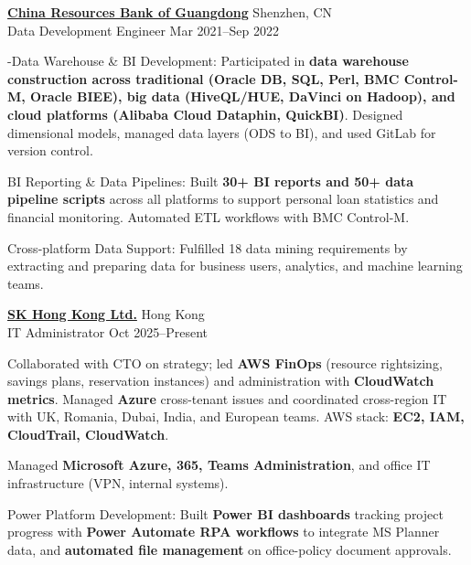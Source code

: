 \begin{entrylist}
    \item \textbf{\href{https://www.crbank.com.cn/}{China Resources Bank of Guangdong}} \hfill Shenzhen, CN\\
    Data Development Engineer \hfill Mar 2021--Sep 2022\\

    \begin{detaillist}
        \item -Data Warehouse \& BI Development: Participated in \textbf{data warehouse construction across traditional (Oracle DB, SQL, Perl, BMC Control-M, Oracle BIEE), big data (HiveQL/HUE, DaVinci on Hadoop), and cloud platforms (Alibaba Cloud Dataphin, QuickBI)}. Designed dimensional models, managed data layers (ODS to BI), and used GitLab for version control.

        \item BI Reporting \& Data Pipelines: Built \textbf{30+ BI reports and 50+ data pipeline scripts} across all platforms to support personal loan statistics and financial monitoring. Automated ETL workflows with BMC Control-M.

        \item Cross-platform Data Support: Fulfilled 18 data mining requirements by extracting and preparing data for business users, analytics, and machine learning teams.

    \end{detaillist}

    \item \href{https://skhongkongltd.com/}{\textbf{SK Hong Kong Ltd.}} \hfill  Hong Kong\\
    IT Administrator \hfill Oct 2025--Present\\

    \begin{detaillist}
        \item Collaborated with CTO on strategy; led \textbf{AWS FinOps} (resource rightsizing, savings plans, reservation instances) and administration with \textbf{CloudWatch metrics}. Managed \textbf{Azure} cross-tenant issues and coordinated cross-region IT with UK, Romania, Dubai, India, and European teams. AWS stack: \textbf{EC2, IAM, CloudTrail, CloudWatch}.

        \item Managed \textbf{Microsoft Azure, 365, Teams Administration}, and office IT infrastructure (VPN, internal systems).

        \item Power Platform Development: Built \textbf{Power BI dashboards} tracking project progress with \textbf{Power Automate RPA workflows} to integrate MS Planner data, and \textbf{automated file management} on office-policy document approvals.
    \end{detaillist}


\end{entrylist}
